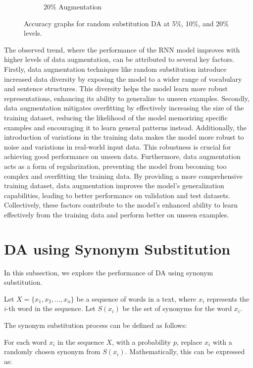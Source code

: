\documentclass{article}
\begin{document}
\begin{figure}[ht]
\begin{subfigure}[b]{0.3\textwidth}
    \caption{20\% Augmentation}
    \label{fig:random_20}
  \end{subfigure}
  \caption{Accuracy graphs for random substitution DA at 5\%, 10\%, and 20\% levels.}
  \label{fig:random_substitution_acc}
\end{figure}

The observed trend, where the performance of the RNN model improves with higher
levels of data augmentation, can be attributed to several key factors. Firstly,
data augmentation techniques like random substitution introduce increased data
diversity by exposing the model to a wider range of vocabulary and sentence
structures. This diversity helps the model learn more robust representations,
enhancing its ability to generalize to unseen examples. Secondly, data
augmentation mitigates overfitting by effectively increasing the size of the
training dataset, reducing the likelihood of the model memorizing specific
examples and encouraging it to learn general patterns instead. Additionally,
the introduction of variations in the training data makes the model more robust
to noise and variations in real-world input data. This robustness is crucial
for achieving good performance on unseen data. Furthermore, data augmentation
acts as a form of regularization, preventing the model from becoming too
complex and overfitting the training data. By providing a more comprehensive
training dataset, data augmentation improves the model's generalization
capabilities, leading to better performance on validation and test datasets.
Collectively, these factors contribute to the model's enhanced ability to learn
effectively from the training data and perform better on unseen examples.

\section{DA using Synonym Substitution}

In this subsection, we explore the performance of DA using synonym
substitution.

Let \( X = \{x_1, x_2, \ldots, x_n\} \) be a sequence of words in a text, where
\( x_i \) represents the \( i \)-th word in the sequence. Let \( S(x_i) \) be
the set of synonyms for the word \( x_i \).

The synonym substitution process can be defined as follows:

For each word \( x_i \) in the sequence \( X \), with a probability \( p \),
replace \( x_i \) with a randomly chosen synonym from \( S(x_i) \).
Mathematically, this can be expressed as:
\end{document}
